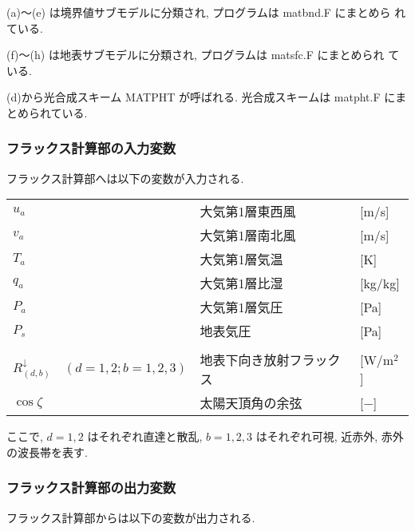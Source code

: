 (a)〜(e) は境界値サブモデルに分類され, プログラムは matbnd.F にまとめら
れている.

(f)〜(h) は地表サブモデルに分類され, プログラムは matsfc.F にまとめられ
ている.

(d)から光合成スキーム MATPHT が呼ばれる. 光合成スキームは matpht.F にま
とめられている.

\subsubsection{フラックス計算部の入力変数}

フラックス計算部へは以下の変数が入力される.

\begin{tabular}{llll}
$u_a$          &                     & 大気第1層東西風 & [m/s] \\
$v_a$          &                     & 大気第1層南北風 & [m/s] \\
$T_a$          &                     & 大気第1層気温   & [K]   \\
$q_a$          &                     & 大気第1層比湿   & [kg/kg]\\
$P_a$          &                     & 大気第1層気圧   & [Pa]  \\
$P_s$          &                     & 地表気圧        & [Pa]  \\
\\
$R^{\downarrow}_{(d,b)}$ & $(d=1,2;b=1,2,3)$ & 地表下向き放射フラックス & [W/m$^2$]\\
$\cos\zeta$    &                     & 太陽天頂角の余弦 & [$-$]\\
\end{tabular}
\medskip

ここで, $d=1,2$ はそれぞれ直達と散乱, $b=1,2,3$ はそれぞれ可視, 近赤外, 赤外の波長帯を表す.

\subsubsection{フラックス計算部の出力変数}

フラックス計算部からは以下の変数が出力される.

